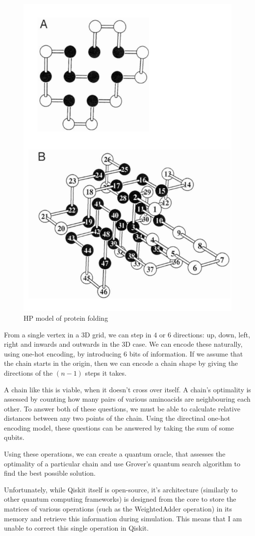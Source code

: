 \begin{figure}[H]
    \centering
    \includegraphics[width=0.5\linewidth]{figures/bioinformatics/hp_model.png}
    \caption{HP model of protein folding\cite{dill_principles_2008}}
\end{figure}

From a single vertex in a 3D grid, we can step in $4$ or $6$ directions: up, down, left, right and inwards and outwards in the 3D case. We can encode these naturally, using one-hot encoding, by introducing $6$ bits of information. If we assume that the chain starts in the origin, then we can encode a chain shape by giving the directions of the $(n-1)$ steps it takes.

A chain like this is viable, when it doesn't cross over itself. A chain's optimality is assessed by counting how many pairs of various aminoacids are neighbouring each other. To answer both of these questions, we must be able to calculate relative distances between any two points of the chain. Using the directinal one-hot encoding model, these questions can be answered by taking the sum of some qubits.

Using these operations, we can create a quantum oracle, that assesses the optimality of a particular chain and use Grover's quantum search algorithm to find the best possible solution.

Unfortunately, while Qiskit itself is open-source, it's architecture (similarly to other quantum computing frameworks) is designed from the core to store the matrices of various operations (such as the WeightedAdder operation) in its memory and retrieve this information during simulation. This means that I am unable to correct this single operation in Qiskit.

